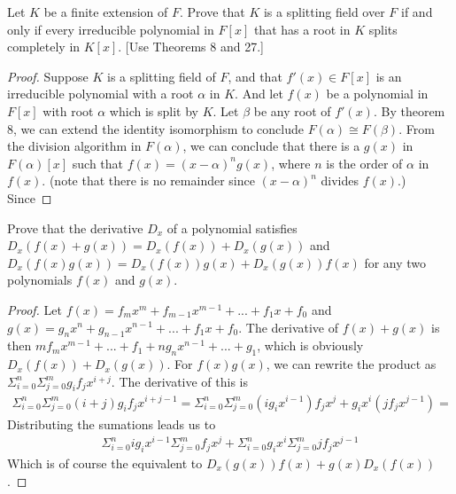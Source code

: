 \documentclass[10pt]{article}
\newenvironment{problem}[2][Problem]{\begin{trivlist}
		\item[\hskip \labelsep {\bfseries #1}\hskip \labelsep {\bfseries #2.}]}{\end{trivlist}}
\begin{document}
	\begin{problem}{4.5}
		Let $K$ be a finite extension of $F$. Prove that $K$ is a splitting field over $F$ if and only if every irreducible polynomial in $F[x]$ that has a root in $K$ splits completely in $K[x]$. [Use
		Theorems 8 and 27.]
		\begin{proof}
			Suppose $K$ is a splitting field of $F$, and that $f'(x) \in F[x]$ is an irreducible polynomial with a root $\alpha$ in $K$. And let $f(x)$ be a polynomial in $F[x]$ with root $\alpha$ which is split by $K$. Let $\beta$ be any root of $f'(x)$. By theorem 8, we can extend the identity isomorphism to conclude $F(\alpha) \cong F(\beta)$. 
			From the division algorithm in $F(\alpha)$, we can conclude that there is a $g(x)$ in $F(\alpha)[x]$ such that $f(x) = (x-\alpha)^ng(x)$, where $n$ is the order of $\alpha$ in $f(x)$. (note that there is no remainder since $(x-\alpha)^n$ divides $f(x)$.) Since 
		\end{proof}
	\end{problem}
	
	\begin{problem}{5.1}
		Prove that the derivative $D_x$ of a polynomial satisfies $D_x(f(x) + g(x)) = D_x(f(x)) +	D_x(g(x))$ and $D_x(f(x)g(x)) = D_x(f(x))g(x) + D_x(g(x))f(x)$ for any two polynomials	$f(x)$ and $g(x)$.
		\begin{proof}
			Let $f(x) = f_mx^m + f_{m-1}x^{m-1} + ... + f_1x + f_0$ and $g(x) = g_nx^n + g_{n-1}x^{n-1} + ... + f_1x + f_0$. The derivative of $f(x) + g(x)$ is then $mf_mx^{m-1} + ... + f_1 + ng_nx^{n-1} + ... + g_1$, which is obviously $D_x(f(x)) + D_x(g(x))$. For $f(x)g(x)$, we can rewrite the product as $\Sigma_{i=0}^n\Sigma_{j=0}^m g_if_jx^{i+j}$. The derivative of this is
			\begin{align*}
				\Sigma_{i=0}^n\Sigma_{j=0}^m (i+j)g_if_jx^{i+j-1} = \Sigma_{i=0}^n\Sigma_{j=0}^m (ig_ix^{i-1})f_jx^{j} + g_ix^{i}(jf_jx^{j-1}) = 
			\end{align*} 
			Distributing the sumations leads us to
			\begin{align*}
				\Sigma_{i=0}^nig_ix^{i-1}\Sigma_{j=0}^mf_jx^{j} + \Sigma_{i=0}^ng_ix^{i}\Sigma_{j=0}^mjf_jx^{j-1}
			\end{align*}
			Which is of course the equivalent to $D_x(g(x))f(x) + g(x)D_x(f(x))$.
		\end{proof}
	\end{problem}
	
\end{document}
